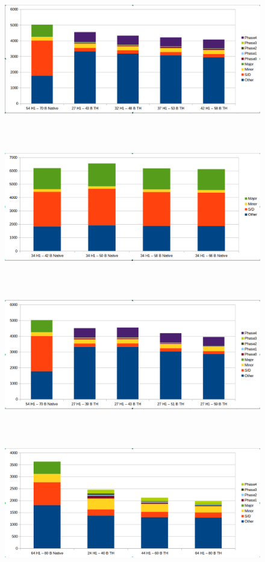 \documentclass[twocolumn,10pt]{asme2e}
\begin{document}
\begin{figure}[h!]
        \includegraphics[width=12cm,height=6cm]{linr_h1_th.png}
\end{figure}

\begin{figure}[h!]
        \includegraphics[width=12cm,height=6cm]{linr_pc_native.png}
\end{figure}

\begin{figure}[h!]
        \includegraphics[width=12cm,height=6cm]{linr_pc_th.png}
\end{figure}

\begin{figure}[h!]
        \includegraphics[width=12cm,height=6cm]{pr_h1_th.png}
\end{figure}
\end{document}
